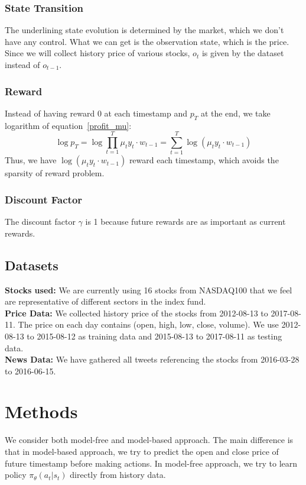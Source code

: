 \documentclass[a4paper, 10pt]{article}
\begin{document}
\begin{spacing}{1.2}
    \subsubsection{State Transition}
    The underlining state evolution is determined by the market, which we don't have any control. What we can get is the observation state, which is the price. Since we will collect history price of various stocks, $o_t$ is given by the dataset instead of $o_{t-1}$.\\
    \subsubsection{Reward}
    Instead of having reward 0 at each timestamp and $p_T$ at the end, we take logarithm of equation~\ref{profit_mu}:
    \begin{equation}
    \log{p_T}=\log{\prod_{t=1}^{T}\mu_t y_t\cdot w_{t-1}}=\sum_{t=1}^{T}\log(\mu_t y_t\cdot w_{t-1})
    \end{equation}
    Thus, we have $\log(\mu_t y_t\cdot w_{t-1})$ reward each timestamp, which avoids the sparsity of reward problem.\\
    \subsubsection{Discount Factor}
    The discount factor $\gamma$ is 1 because future rewards are as important as current rewards.
    
    \subsection{Datasets}
    \textbf{Stocks used:}
    We are currently using 16 stocks from NASDAQ100 that we feel are representative of different sectors in the index fund. \\
    \textbf{Price Data:}
    We collected history price of the stocks from 2012-08-13 to 2017-08-11. The price on each day contains (open, high, low, close, volume). We use 2012-08-13 to 2015-08-12 as training data and 2015-08-13 to 2017-08-11 as testing data.\\
    \textbf{News Data:}
    We have gathered all tweets referencing the stocks from 2016-03-28 to 2016-06-15. 
    \section{Methods}
    We consider both model-free and model-based approach. The main difference is that in model-based approach, we try to predict the open and close price of future timestamp before making actions. In model-free approach, we try to learn policy $\pi_{\theta}(a_t|s_t)$ directly from history data.

\end{spacing}
\end{document}
